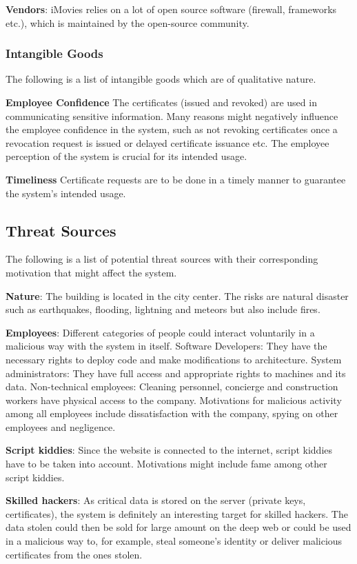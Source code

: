 \documentclass[english]{article}
\begin{document}
\textbf{Vendors}: iMovies relies on a lot of open source software (firewall, frameworks etc.), which is maintained by the open-source community.

\subsubsection{Intangible Goods}
The following is a list of intangible goods which are of qualitative nature.

\textbf{Employee Confidence} The certificates (issued and revoked) are used in communicating sensitive information. Many reasons might negatively influence the employee confidence in the system, such as not revoking certificates once a revocation request is issued or delayed certificate issuance etc. The employee perception of the system is crucial for its intended usage. 

\textbf{Timeliness} 
Certificate requests are to be done in a timely manner to guarantee the system's intended usage.

\subsection{Threat Sources}

The following is a list of potential threat sources with their corresponding motivation that might affect the system.

\textbf{Nature}: The building is located in the city center. The risks are natural disaster such as earthquakes, flooding, lightning and meteors but also include fires.

\textbf{Employees}: Different categories of people could interact voluntarily in a malicious way with the system in itself. Software Developers: They have the necessary rights to deploy code and make modifications to architecture. System administrators: They have full access and appropriate rights to machines and its data. Non-technical employees: Cleaning personnel, concierge and construction workers have physical access to the company.
Motivations for malicious activity among all employees include dissatisfaction with the company, spying on other employees and negligence.

\textbf{Script kiddies}: Since the website is connected to the internet, script kiddies have to be taken into account. Motivations might include fame among other script kiddies.

\textbf{Skilled hackers}: As critical data is stored on the server (private keys, certificates), the system is definitely an interesting target for skilled hackers. The data stolen could then be sold for large amount on the deep web or could be used in a malicious way to, for example, steal someone's identity or deliver malicious certificates from the ones stolen.
\end{document}
